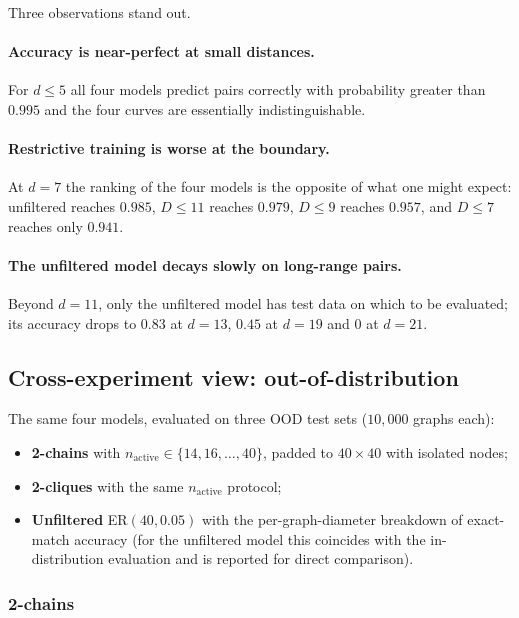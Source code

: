 \documentclass[11pt,a4paper]{article}
\begin{document}
Three observations stand out.

\paragraph{Accuracy is near-perfect at small distances.} For $d \le 5$ all
four models predict pairs correctly with probability greater than
$0.995$ and the four curves are essentially indistinguishable.

\paragraph{Restrictive training is worse at the boundary.} At $d = 7$
the ranking of the four models is the opposite of what one might expect:
unfiltered reaches $0.985$, $D \le 11$ reaches $0.979$, $D \le 9$ reaches
$0.957$, and $D \le 7$ reaches only $0.941$. 

\paragraph{The unfiltered model decays slowly on long-range pairs.} Beyond
$d = 11$, only the unfiltered model has test data on which to be
evaluated; its accuracy drops to $0.83$ at $d = 13$, $0.45$ at $d = 19$
and $0$ at $d = 21$.

\subsection{Cross-experiment view: out-of-distribution}
\label{sec:ch2-cross-ood}

The same four models, evaluated on three OOD test sets ($10{,}000$ graphs
each):
\begin{itemize}
    \item \textbf{2-chains} with $n_{\text{active}} \in \{14, 16, \ldots, 40\}$,
          padded to $40 \times 40$ with isolated nodes;
    \item \textbf{2-cliques} with the same $n_{\text{active}}$ protocol;
    \item \textbf{Unfiltered} ER$(40, 0.05)$ with the per-graph-diameter
          breakdown of exact-match accuracy (for the unfiltered model this
          coincides with the in-distribution evaluation and is reported for
          direct comparison).
\end{itemize}

\subsubsection*{2-chains}
\end{document}
